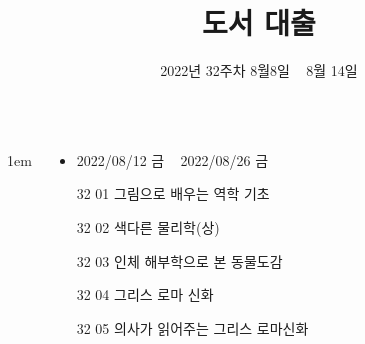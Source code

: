 \documentclass[	20pt, 
							a1paper, 
							portrait, %
							margin=0mm, %
							innermargin=10mm,  		%
							colspace=5mm, 
							subcolspace=0mm
							]{tikzposter}
\title{도서 대출}
\author{ 2022년 32주차 8월8일 ~ 8월 14일  }
\begin{document}
	\maketitle

	\begin{columns}


			{
					\setlength{\leftmargini}{4em}
					\setlength{\labelsep} {1em}
				\begin{LARGE}
					\begin{itemize}
					\item 	2022/08/12 금 ~ 2022/08/26 금
					\item 	[32 01] 그림으로 배우는 역학 기초
					\item 	[32 02] 색다른 물리학(상)
					\item 	[32 03] 인체 해부학으로 본 동물도감
					\item 	[32 04] 그리스 로마 신화
					\item 	[32 05] 의사가 읽어주는 그리스 로마신화
					\end{itemize}
				\end{LARGE}
			}







\end{columns}
\end{document}
